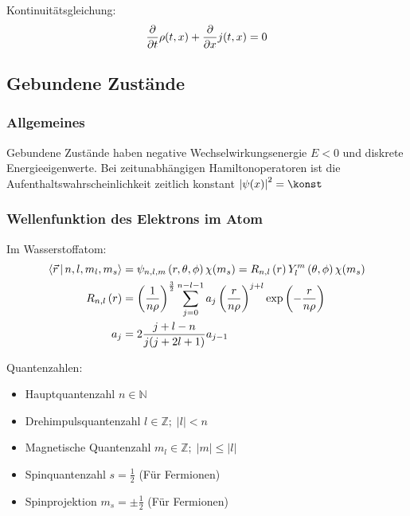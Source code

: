\documentclass[11pt]{article}
\numberwithin{equation}{section}
\begin{document}
			\noindent
			Kontinuitätsgleichung:
			\begin{equation}
				\frac{\partial }{\partial t}\rho(t,x) + \frac{\partial }{\partial x}j(t,x) = 0
			\end{equation}

		\subsection{Gebundene Zustände}
			\subsubsection{Allgemeines}
				\noindent
				Gebundene Zustände haben negative Wechselwirkungsenergie $E<0$ und diskrete Energieeigenwerte. Bei zeitunabhängigen Hamiltonoperatoren ist die Aufenthaltswahrscheinlichkeit zeitlich konstant $\left|\psi(x)\right|^2=\konst$

			\subsubsection{Wellenfunktion des Elektrons im Atom}
				\noindent
				Im Wasserstoffatom:
				\begin{equation}
					\begin{aligned}
						\Braket{\vec{r}|n,l,m_l,m_s} &= \psi_{n,l,m}\left(r,\theta,\phi\right)\chi(m_s)
						= R_{n,l}\left(r\right) Y_l^m\left(\theta,\phi\right)\chi(m_s) \\
						R_{n,l}\left(r\right)
						&= \left(\frac{1}{n\rho}\right)^{\frac{3}{2}}
						\sum_{j=0}^{n-l-1} a_j \left(\frac{r}{n\rho}\right)^{j+l} \exp\left({-\frac{r}{n\rho}}\right) \\
						a_j &= 2\frac{j+l-n}{j(j+2l+1)} a_{j-1} \\
					\end{aligned}
				\end{equation}

				\noindent
				Quantenzahlen:
				\begin{itemize}
					\item Hauptquantenzahl $n \in \mathbb{N}$
					\item Drehimpulsquantenzahl $l \in \mathbb{Z};\; \left|l\right| < n$
					\item Magnetische Quantenzahl $m_l \in \mathbb{Z};\; \left|m\right| \le \left|l\right|$
					\item Spinquantenzahl $s = \frac{1}{2}$ (Für Fermionen)
					\item Spinprojektion $m_s = \pm \frac{1}{2}$ (Für Fermionen)
				\end{itemize}
\end{document}
